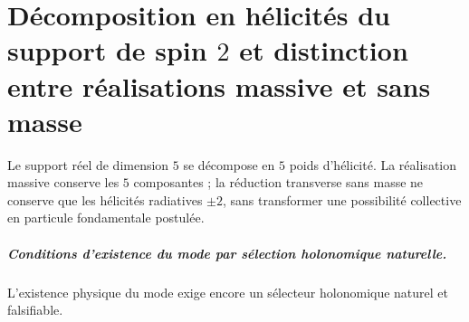 \chapter{Décomposition en hélicités du support de spin \texorpdfstring{\(2\)}{2} et distinction entre réalisations massive et sans masse}
\label{chap:parte-iv-65}

Le support réel de dimension \(5\) se décompose en \(5\) poids d’hélicité. La réalisation massive conserve les \(5\) composantes ; la réduction transverse sans masse ne conserve que les hélicités radiatives \(\pm2\), sans transformer une possibilité collective en particule fondamentale postulée.



\paragraph{Conditions d’existence du mode par sélection holonomique naturelle.} L’existence physique du mode exige encore un sélecteur holonomique naturel et falsifiable.
